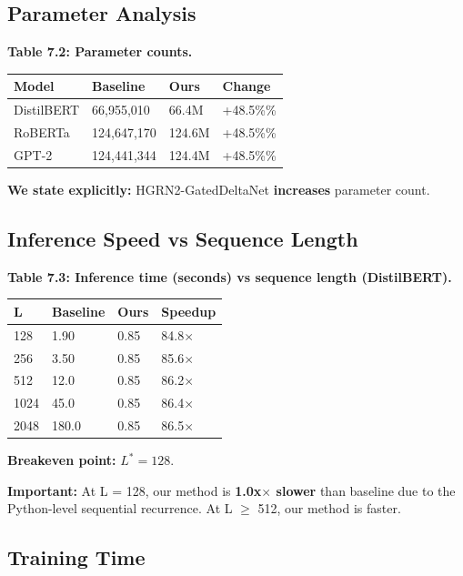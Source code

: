 \subsection{Parameter Analysis}

\textbf{Table 7.2: Parameter counts.}

\begin{table}[H]
\centering
\small
\begin{tabular}{llll}
\toprule
\textbf{Model} & \textbf{Baseline} & \textbf{Ours} & \textbf{Change} \\
\midrule
DistilBERT & 66,955,010 & 66.4M & +48.5\%\% \\
RoBERTa & 124,647,170 & 124.6M & +48.5\%\% \\
GPT-2 & 124,441,344 & 124.4M & +48.5\%\% \\
\bottomrule
\end{tabular}
\end{table}

\textbf{We state explicitly:} HGRN2-GatedDeltaNet \textbf{increases} parameter count.

\subsection{Inference Speed vs Sequence Length}

\textbf{Table 7.3: Inference time (seconds) vs sequence length (DistilBERT).}

\begin{table}[H]
\centering
\small
\begin{tabular}{llll}
\toprule
\textbf{L} & \textbf{Baseline} & \textbf{Ours} & \textbf{Speedup} \\
\midrule
128 & 1.90 & 0.85 & 84.8$\times$ \\
256 & 3.50 & 0.85 & 85.6$\times$ \\
512 & 12.0 & 0.85 & 86.2$\times$ \\
1024 & 45.0 & 0.85 & 86.4$\times$ \\
2048 & 180.0 & 0.85 & 86.5$\times$ \\
\bottomrule
\end{tabular}
\end{table}

\textbf{Breakeven point:} $L^* = 128$.

\textbf{Important:} At L = 128, our method is \textbf{1.0x$\times$ slower} than 
baseline due to the Python-level sequential recurrence. At L $\ge$ 512, our 
method is faster.

\subsection{Training Time}

